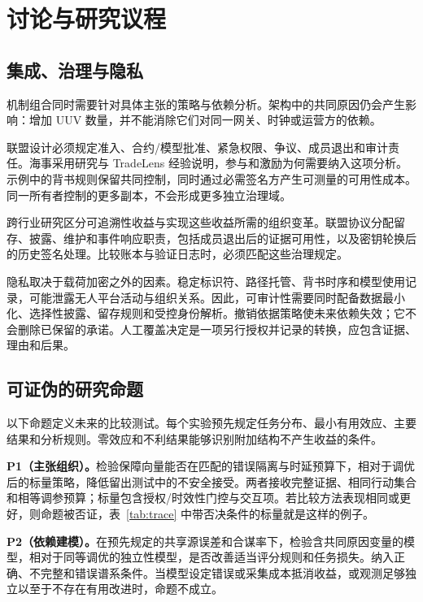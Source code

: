 \section{讨论与研究议程}
\subsection{集成、治理与隐私}

机制组合同时需要针对具体主张的策略与依赖分析。架构中的共同原因仍会产生影响：增加 UUV 数量，并不能消除它们对同一网关、时钟或运营方的依赖。

联盟设计必须规定准入、合约/模型批准、紧急权限、争议、成员退出和审计责任。海事采用研究与 TradeLens 经验说明，参与和激励为何需要纳入这项分析\citep{zhou2020key,farah2024survey,maersk2022tradelens}。示例中的背书规则保留共同控制，同时通过必需签名方产生可测量的可用性成本。同一所有者控制的更多副本，不会形成更多独立治理域。

跨行业研究区分可追溯性收益与实现这些收益所需的组织变革\citep{kshetri20181,lnes2017blockchain}。联盟协议分配留存、披露、维护和事件响应职责，包括成员退出后的证据可用性，以及密钥轮换后的历史签名处理。比较账本与验证日志时，必须匹配这些治理规定。

隐私取决于载荷加密之外的因素。稳定标识符、路径托管、背书时序和模型使用记录，可能泄露无人平台活动与组织关系\citep{reyna2018blockchain,kshetri2017can}。因此，可审计性需要同时配备数据最小化、选择性披露、留存规则和受控身份解析。撤销依据策略使未来依赖失效；它不会删除已保留的承诺。人工覆盖决定是一项另行授权并记录的转换，应包含证据、理由和后果。

\subsection{可证伪的研究命题}\label{sec:propositions}

以下命题定义未来的比较测试。每个实验预先规定任务分布、最小有用效应、主要结果和分析规则。零效应和不利结果能够识别附加结构不产生收益的条件。

\textbf{P1（主张组织）。}检验保障向量能否在匹配的错误隔离与时延预算下，相对于调优后的标量策略，降低留出测试中的不安全接受。两者接收完整证据、相同行动集合和相等调参预算；标量包含授权/时效性门控与交互项。若比较方法表现相同或更好，则命题被否证，表~\ref{tab:trace} 中带否决条件的标量就是这样的例子。

\textbf{P2（依赖建模）。}在预先规定的共享源误差和合谋率下，检验含共同原因变量的模型，相对于同等调优的独立性模型，是否改善适当评分规则和任务损失。纳入正确、不完整和错误谱系条件。当模型设定错误或采集成本抵消收益，或观测足够独立以至于不存在有用改进时，命题不成立。

